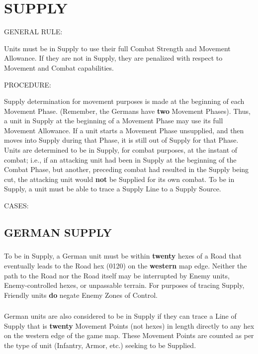 \section{SUPPLY}

GENERAL RULE:

Units must be in Supply to use their full Combat Strength and Movement Allowance. If they are not in Supply, they are penalized with respect to Movement and Combat capabilities.

PROCEDURE:

Supply determination for movement purposes is made at the beginning of each Movement Phase. (Remember, the Germans have \textbf{two} Movement Phases). Thus, a unit in Supply at the beginning of a Movement Phase may use its full Movement Allowance. If a unit starts a Movement Phase unsupplied, and then moves into Supply during that Phase, it is still out of Supply for that Phase. Units are determined to be in Supply, for combat purposes, at the instant of combat; i.e., if an attacking unit had been in Supply at the beginning of the Combat Phase, but another, preceding combat had resulted in the Supply being cut, the attacking unit would \textbf{not} be Supplied for its own combat. To be in Supply, a unit must be able to trace a Supply Line to a Supply Source.

CASES:

\subsection{GERMAN SUPPLY}

\subsubsection{} To be in Supply, a German unit must be within \textbf{twenty} hexes of a Road that eventually leads to the Road hex (0120) on the \textbf{western} map edge. Neither the path to the Road nor the Road itself may be interrupted by Enemy units, Enemy-controlled hexes, or unpassable terrain. For purposes of tracing Supply, Friendly units \textbf{do} negate Enemy Zones of Control.

\subsubsection{} German units are also considered to be in Supply if they can trace a Line of Supply that is \textbf{twenty} Movement Points (not hexes) in length directly to any hex on the western edge of the game map. These Movement Points are counted as per the type of unit (Infantry, Armor, etc.) seeking to be Supplied.


